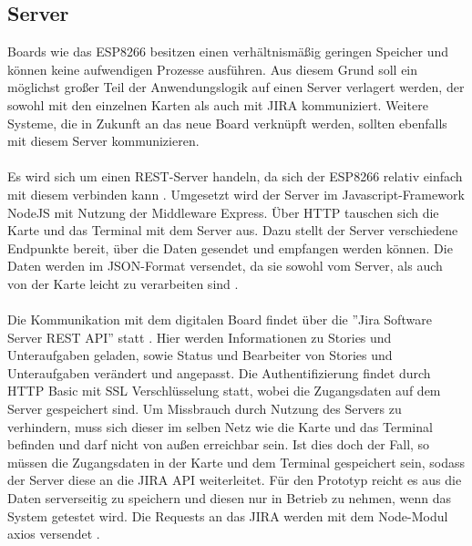 \documentclass[12pt,titlepage]{scrartcl}
\begin{document}
		\subsection{Server} \label{techserver}
		Boards wie das ESP8266 besitzen einen verhältnismäßig geringen Speicher und können keine aufwendigen Prozesse ausführen. Aus diesem Grund soll ein möglichst großer Teil der Anwendungslogik auf einen Server verlagert werden, der sowohl mit den einzelnen Karten als auch mit JIRA kommuniziert. Weitere Systeme, die in Zukunft an das neue Board verknüpft werden, sollten ebenfalls mit diesem Server kommunizieren. \\ \\
		Es wird sich um einen REST-Server handeln, da sich der ESP8266 relativ einfach mit diesem verbinden kann \cite{nodemcuexamples}. Umgesetzt wird der Server im Javascript-Framework NodeJS mit Nutzung der Middleware Express. Über HTTP tauschen sich die Karte und das Terminal mit dem Server aus. Dazu stellt der Server verschiedene Endpunkte bereit, über die Daten gesendet und empfangen werden können. Die Daten werden im JSON-Format versendet, da sie sowohl vom Server, als auch von der Karte leicht zu verarbeiten sind \cite{arduinojson}. \\ \\
		Die Kommunikation mit dem digitalen Board findet über die ''Jira Software Server REST API'' statt \cite{jiraapi}. Hier werden Informationen zu Stories und Unteraufgaben geladen, sowie Status und Bearbeiter von Stories und Unteraufgaben verändert und angepasst. Die Authentifizierung findet durch HTTP Basic mit SSL Verschlüsselung statt, wobei die Zugangsdaten auf dem Server gespeichert sind. Um Missbrauch durch Nutzung des Servers zu verhindern, muss sich dieser im selben Netz wie die Karte und das Terminal befinden und darf nicht von außen erreichbar sein. Ist dies doch der Fall, so müssen die Zugangsdaten in der Karte und dem Terminal gespeichert sein, sodass der Server diese an die JIRA API weiterleitet. Für den Prototyp reicht es aus die Daten serverseitig zu speichern und diesen nur in Betrieb zu nehmen, wenn das System getestet wird. Die Requests an das JIRA werden mit dem Node-Modul axios versendet \cite{npmaxios}.
\end{document}
